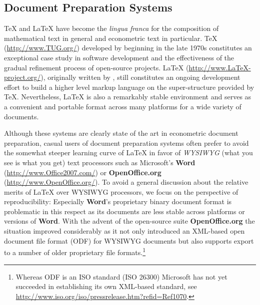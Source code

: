 \documentclass[10pt,a4paper,twoside]{article}
\let\pkg=\textbf
\let\proglang=\textsf
\begin{document}


\subsection{Document Preparation Systems} \label{sec:document}

{\TeX} and {\LaTeX} have become the \emph{lingua franca} for the composition 
of mathematical text in general and econometric text in particular.
{\TeX} (\url{http://www.TUG.org/}) developed by \cite{repro:Knuth:1984}
beginning in the late 1970s constitutes an exceptional case study in 
software development and the effectiveness of the gradual refinement process 
of open-source projects.  
{\LaTeX} (\url{http://www.LaTeX-project.org/}), originally written by  \cite{repro:Lamport:1994},
still constitutes an ongoing development effort to build a higher level markup
language on the super-structure provided by {\TeX}.  Nevertheless, {\LaTeX} is also
a remarkably stable environment and serves as a convenient and portable format
across many platforms for a wide variety of documents. 

Although these systems are clearly state of the art in econometric document
preparation, casual users of document preparation systems often prefer to avoid
the somewhat steeper learning curve of {\LaTeX} in favor of \emph{WYSIWYG}
(what you see is what you get) text processors such as Microsoft's \pkg{Word}
(\url{http://www.Office2007.com/}) or \pkg{OpenOffice.org} (\url{http://www.OpenOffice.org/}).
To avoid a general
discussion about the relative merits of {\LaTeX} over WYSIWYG processors, we focus
on the perspective of reproducibility: Especially \pkg{Word}'s proprietary binary document
format is problematic in this respect as its documents are less stable across platforms or
versions of \pkg{Word}. With the advent of the open-source suite \pkg{OpenOffice.org}
the situation improved considerably as it not only introduced an \proglang{XML}-based
open document file format (ODF) for WYSIWYG documents but also supports export to 
a number of older proprietary file formats.\footnote{Whereas ODF is an ISO standard
(ISO 26300) Microsoft has not yet succeeded in establishing its own \proglang{XML}-based
standard, see \url{http://www.iso.org/iso/pressrelease.htm?refid=Ref1070}.}
\end{document}
